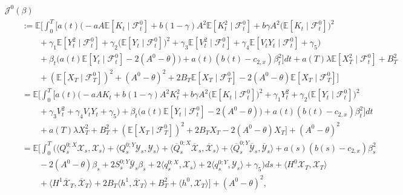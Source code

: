 \documentclass[11pt,twoside]{amsart}
\theoremstyle{definition}
\numberwithin{equation}{section}
\newcommand{\E}{\mathbb{E}}
\newcommand{\ItF}{\mathcal{F}}
\renewcommand{\bar}{\overline}
\begin{document}
\begin{align}
    \label{eqn: mf target function regulator}
    &\mathcal{J}^0(\beta) \\
    &\nonumber\qquad :=\E \Bigg[ \int_0^T\Bigg[a(t) \Bigg(  -aA\E[K_t \mid \ItF^0_t] + b(1-\gamma)  A^2\E[ K^2_t \mid \ItF^0_t] + b \gamma A^2 \Big( \E[K_t\mid \ItF^0_t] \Big)^2  \\
    &\nonumber\qquad \qquad+ \gamma_1 \E[Y^2_t\mid\ItF^0_t] + \gamma_2 \Big(\E[Y_t \mid \ItF^0_t]\Big)^2 + \gamma_3 \E[ V^2_t\mid \ItF^0_t]  + \gamma_4 \E[V_t Y_t \mid \ItF^0_t] + \gamma_5\Bigg) \\
    &\nonumber\qquad\qquad  + \beta_t \big( a(t)\E[Y_t \mid \ItF^0_t] - 2(A^0-\theta)\big) +a(t)(b(t)-c_{2,x}) \beta^2_t \Bigg] dt + a(T) \lambda \E[X^2_T \mid \ItF^0_t] + B^2_T  \\
    &\nonumber\qquad\qquad + (\E[X_T\mid \ItF^0_T])^2+ (A^0 -\theta)^2 + 2 B_T \E[X_T \mid \ItF^0_T] - 2 (A^0 - \theta) \E[X_T \mid \ItF^0_T]\Bigg]\\
    &\nonumber\qquad =\E \Bigg[ \int_0^T\Bigg[a(t) \Bigg(  -aAK_t + b(1-\gamma) A^2 K^2_t + b  \gamma A^2\Big( \E[K_t\mid \ItF^0_t] \Big)^2 + \gamma_1Y^2_t+ \gamma_2 \Big(\E[Y_t \mid \ItF^0_t]\Big)^2 \\
    &\nonumber\qquad \qquad +\gamma_3 V^2_t + \gamma_4 V_t Y_t  + \gamma_5\Bigg) + \beta_t \big( a(t)\E[Y_t\mid \ItF^0_t]  - 2(A^0 - \theta)\big) +a(t)(b(t)-c_{2,x}) \beta^2_t \Bigg] dt \\
    &\nonumber \qquad\qquad+ a(T) \lambda X^2_T+B^2_T + (\E[X_T\mid \ItF^0_T])^2 + 2B_TX_T - 2(A^0-\theta)X_T\Bigg] + (A^0-\theta)^2\\
    &\nonumber\qquad = \E\Bigg[ \int_0^T (\langle Q^{0;X}_s \mathcal{X}_s,\mathcal{X}_s\rangle+\langle Q^{0;Y}_s \mathcal{Y}_s,\mathcal{Y}_s\rangle + \langle \bar{Q}^{0;X}_s \bar{\mathcal{X}}_s, \bar{\mathcal{X}}_s\rangle+ \langle \bar{Q}^{0;Y}_s \bar{\mathcal{Y}}_s, \bar{\mathcal{Y}}_s\rangle +a(s)(b(s)- c_{2,x})\beta_s^2\\
    &\nonumber\qquad \qquad  -2(A^0-\theta)\beta_s+ 2 S^{0;Y}_s \bar{\mathcal{Y}}_s \beta_s  + 2 \langle q^{0;X}_s , \mathcal{X}_s\rangle + 2 \langle q^{0;Y}_s ,\mathcal{Y}_s\rangle + \gamma_5) ds + \langle H^0 \mathcal{X}_T , \mathcal{X}_T\rangle\\
    &\nonumber\qquad\qquad + \langle H^1\bar{\mathcal{X}}_T, \bar{\mathcal{X}}_T\rangle + 2B_T \langle h^1, \bar{\mathcal{X}}_T \rangle+ B^2_T + \langle h^0, \mathcal{X}_T\rangle\Bigg]+ (A^0 - \theta)^2,
\end{align} 
\end{document}
